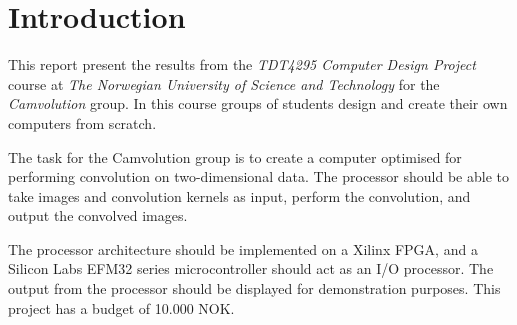 \chapter{Introduction}
This report present the results from the \textit{TDT4295 Computer Design Project} course at \textit{The Norwegian University of Science and Technology} for the \textit{Camvolution} group.
In this course groups of students design and create their own computers from scratch.

The task for the Camvolution group is to create a computer optimised for performing convolution on two-dimensional data.
The processor should be able to take images and convolution kernels as input, perform the convolution, and output the convolved images.

The processor architecture should be implemented on a Xilinx FPGA, and a Silicon Labs EFM32 series microcontroller should act as an I/O processor.
The output from the processor should be displayed for demonstration purposes.
This project has a budget of 10.000 NOK.




